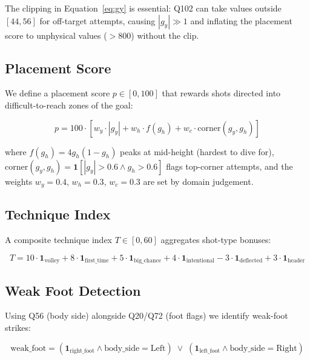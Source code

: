 \documentclass[12pt,a4paper]{article}
\begin{document}
The clipping in Equation~\ref{eq:gy} is essential: Q102 can take values outside $[44, 56]$ for off-target attempts, causing $|g_y| \gg 1$ and inflating the placement score to unphysical values ($>800$) without the clip.

\subsection{Placement Score}

We define a placement score $p \in [0, 100]$ that rewards shots directed into difficult-to-reach zones of the goal:

\begin{equation}
p = 100 \cdot \left[w_y \cdot |g_y| + w_h \cdot f(g_h) + w_c \cdot \text{corner}(g_y, g_h)\right]
\label{eq:placement}
\end{equation}

where $f(g_h) = 4 g_h(1-g_h)$ peaks at mid-height (hardest to dive for), $\text{corner}(g_y, g_h) = \mathbf{1}[|g_y|>0.6 \land g_h>0.6]$ flags top-corner attempts, and the weights $w_y = 0.4$, $w_h = 0.3$, $w_c = 0.3$ are set by domain judgement.

\subsection{Technique Index}

A composite technique index $T \in [0, 60]$ aggregates shot-type bonuses:

\begin{equation}
T = 10 \cdot \mathbf{1}_{\text{volley}} + 8 \cdot \mathbf{1}_{\text{first\_time}} + 5 \cdot \mathbf{1}_{\text{big\_chance}} + 4 \cdot \mathbf{1}_{\text{intentional}} - 3 \cdot \mathbf{1}_{\text{deflected}} + 3 \cdot \mathbf{1}_{\text{header}}
\label{eq:technique}
\end{equation}

\subsection{Weak Foot Detection}

Using Q56 (body side) alongside Q20/Q72 (foot flags) we identify weak-foot strikes:

\begin{equation}
\text{weak\_foot} = (\mathbf{1}_{\text{right\_foot}} \land \text{body\_side} = \text{Left}) \;\lor\; (\mathbf{1}_{\text{left\_foot}} \land \text{body\_side} = \text{Right})
\label{eq:weakfoot}
\end{equation}
\end{document}
